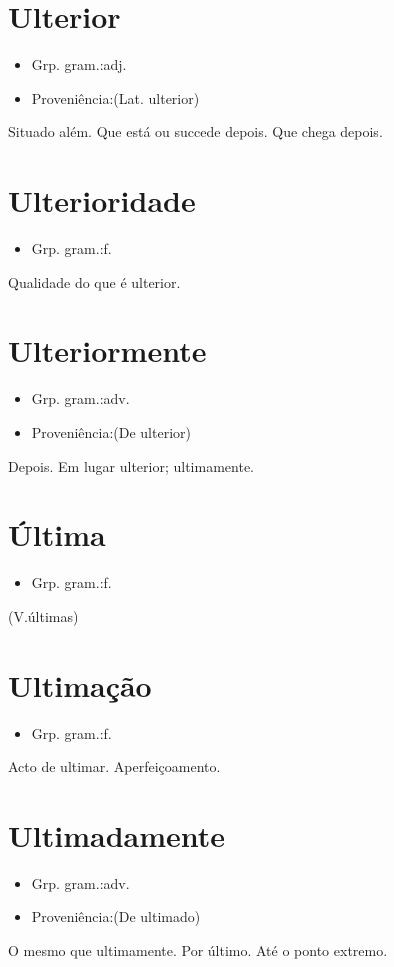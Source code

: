\documentclass{article}
\begin{document}
\section{Ulterior}
\begin{itemize}
\item {Grp. gram.:adj.}
\end{itemize}
\begin{itemize}
\item {Proveniência:(Lat. \textunderscore ulterior\textunderscore )}
\end{itemize}
Situado além.
Que está ou succede depois.
Que chega depois.
\section{Ulterioridade}
\begin{itemize}
\item {Grp. gram.:f.}
\end{itemize}
Qualidade do que é ulterior.
\section{Ulteriormente}
\begin{itemize}
\item {Grp. gram.:adv.}
\end{itemize}
\begin{itemize}
\item {Proveniência:(De \textunderscore ulterior\textunderscore )}
\end{itemize}
Depois.
Em lugar ulterior; ultimamente.
\section{Última}
\begin{itemize}
\item {Grp. gram.:f.}
\end{itemize}
(V.últimas)
\section{Ultimação}
\begin{itemize}
\item {Grp. gram.:f.}
\end{itemize}
Acto de ultimar.
Aperfeiçoamento.
\section{Ultimadamente}
\begin{itemize}
\item {Grp. gram.:adv.}
\end{itemize}
\begin{itemize}
\item {Proveniência:(De \textunderscore ultimado\textunderscore )}
\end{itemize}
O mesmo que \textunderscore ultimamente\textunderscore .
Por último.
Até o ponto extremo.
\end{document}
